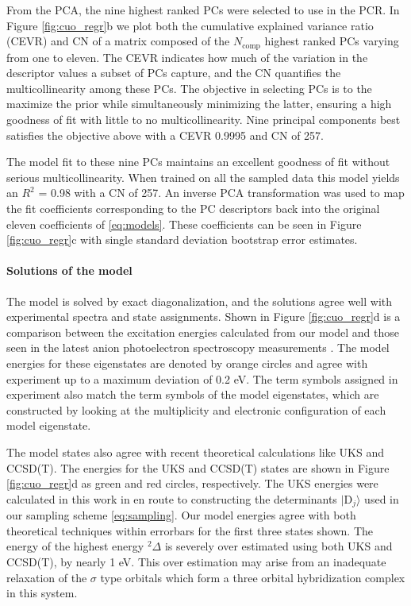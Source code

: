 \documentclass[12pt]{article}
\begin{document}
From the PCA, the nine highest ranked PCs were selected to use in the PCR.
In Figure \eqref{fig:cuo_regr}b we plot both the cumulative explained variance ratio (CEVR) and CN of a matrix composed of the $N_\text{comp}$ highest ranked PCs varying from one to eleven.
The CEVR indicates how much of the variation in the descriptor values a subset of PCs capture, and the CN quantifies the multicollinearity among these PCs.
The objective in selecting PCs is to the maximize the prior while simultaneously minimizing the latter, ensuring a high goodness of fit with little to no multicollinearity.
Nine principal components best satisfies the objective above with a CEVR 0.9995 and CN of 257.

The model fit to these nine PCs maintains an excellent goodness of fit without serious multicollinearity.
When trained on all the sampled data this model yields an $R^2$ = 0.98 with a CN of 257. 
An inverse PCA transformation was used to map the fit coefficients corresponding to the PC descriptors back into the original eleven coefficients of \eqref{eq:models}.
These coefficients can be seen in Figure \ref{fig:cuo_regr}c with single standard deviation bootstrap error estimates.

\paragraph{Solutions of the model}
The model is solved by exact diagonalization, and the solutions agree well with experimental spectra and state assignments.
Shown in Figure \ref{fig:cuo_regr}d is a comparison between the excitation energies calculated from our model and those seen in the latest anion photoelectron spectroscopy measurements \cite{Wu1997}.
The model energies for these eigenstates are denoted by orange circles and agree with experiment up to a maximum deviation of 0.2 eV.
The term symbols assigned in experiment also match the term symbols of the model eigenstates, which are constructed by looking at the multiplicity and electronic configuration of each model eigenstate. 

The model states also agree with recent theoretical calculations like UKS and CCSD(T).
The energies for the UKS and CCSD(T) \cite{Xian2000} states are shown in Figure \ref{fig:cuo_regr}d as green and red circles, respectively.
The UKS energies were calculated in this work in en route to constructing the determinants $|\text{D}_j\rangle$ used in our sampling scheme \eqref{eq:sampling}.
Our model energies agree with both theoretical techniques within errorbars for the first three states shown.
The energy of the highest energy $^2\Delta$ is severely over estimated using both UKS and CCSD(T), by nearly 1 eV.
This over estimation may arise from an inadequate relaxation of the $\sigma$ type orbitals which form a three orbital hybridization complex in this system.
\end{document}
